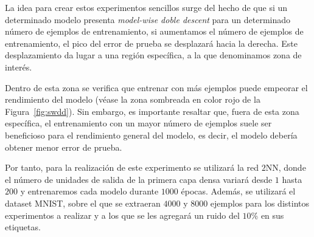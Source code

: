 La idea para crear estos experimentos sencillos surge del hecho de que si un determinado modelo presenta \textit{model-wise doble descent} para un determinado número de ejemplos de entrenamiento, si aumentamos el número de ejemplos de entrenamiento, el pico del error de prueba se desplazará hacia la derecha. Este desplazamiento da lugar a una región específica, a la que denominamos zona de interés.\newline

Dentro de esta zona se verifica que entrenar con más ejemplos puede empeorar el rendimiento del modelo (véase la zona sombreada en color rojo de la Figura~\ref{fig:swdd}). Sin embargo, es importante resaltar que, fuera de esta zona específica, el entrenamiento con un mayor número de ejemplos suele ser beneficioso para el rendimiento general del modelo, es decir, el modelo debería obtener menor error de prueba.\newline

Por tanto, para la realización de este experimento se utilizará la red $2$NN, donde el número de unidades de salida de la primera capa densa variará desde $1$ hasta $200$ y entrenaremos cada modelo durante $1000$ épocas. Además, se utilizará el dataset MNIST, sobre el que se extraeran $4000$ y $8000$ ejemplos para los distintos experimentos a realizar y a los que se les agregará un ruido del $10$\% en sus etiquetas.\newline

